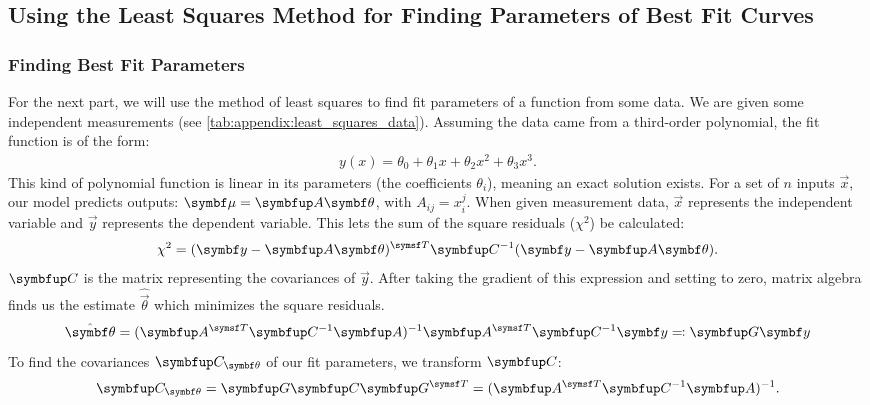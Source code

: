 \subsection{Using the Least Squares Method for Finding Parameters of Best Fit Curves}
\label{sec:least squares}

\subsubsection{Finding Best Fit Parameters}

For the next part, we will use the method of least squares to find fit parameters of a function from some data. 
We are given some independent measurements (see \autoref{tab:appendix:least_squares_data}).
Assuming the data came from a third-order polynomial, the fit function is of the form:
\begin{gather}
    \label{eq:least_squares:fit_polynomial}
    y(x) = θ_0 + θ_1 x + θ_2 x^2 + θ_3 x^3.
\end{gather}
This kind of polynomial function is linear in its parameters (the coefficients \( θ_i \)), meaning an exact solution exists. For a set of \( n \) inputs $\vec{x}$, our model predicts outputs: $ \vec{\mu} = \mat{A} \vec{\theta} $, with $ A_{ij} = x_i^j$. When given measurement data, $\vec{x}$ represents the independent variable and $\vec{y}$ represents the dependent variable.
This lets the sum of the square residuals ($\chi^2$) be calculated:
\begin{equation}
    \label{eq:least_squares:sum_square_residuals_matrix_representation}
    \chi^2 = (\vec{y} - \mat{A}\vec{\theta})\transpose \mat{C}^{-1} (\vec{y} - \mat{A}\vec{\theta}).
\end{equation}
$\mat{C}$ is the matrix representing the covariances of $\vec{y}$.
After taking the gradient of this expression and setting to zero, matrix algebra finds us the estimate $\hat{\vec{\theta}}$ which minimizes the square residuals.
\begin{equation}
    \label{eq:least_squares:finding_theta}
    \hat{\vec{\theta}} = (\mat{A}\transpose \mat{C}^{-1} \mat{A})^{-1} \mat{A}\transpose \mat{C}^{-1} \vec{y} \eqcolon \mat{G} \vec{y}
\end{equation}
To find the covariances $\mat{C}_{\vec{\theta}} $ of our fit parameters, we transform \( \mat{C} \):
\begin{equation}
    \label{eq:least_squares:covariances_theta}
    \mat{C}_{\vec{\theta}} = \mat{G} \mat{C} \mat{G}\transpose  = (\mat{A}\transpose \mat{C}^{-1} \mat{A})^{-1}.
\end{equation}


